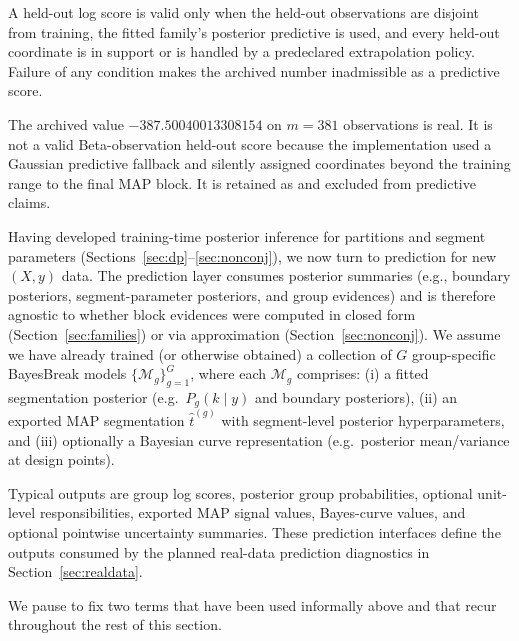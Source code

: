 \begin{definition}
\label{def:metric-loglik}
A held-out log score is valid only when the held-out observations are disjoint from training,
the fitted family's posterior predictive is used, and every held-out coordinate is in support or
is handled by a predeclared extrapolation policy. Failure of any condition makes the archived
number inadmissible as a predictive score.
\end{definition}

\begin{exclusionbox}
The archived value $-387.50040013308154$ on $m=381$ observations is real. It is not a valid
Beta-observation held-out score because the implementation used a Gaussian predictive fallback and
silently assigned coordinates beyond the training range to the final MAP block. It is retained as
 and excluded from predictive claims.
\end{exclusionbox}
\label{sec:prediction}

Having developed training-time posterior inference for partitions and segment parameters (Sections~\ref{sec:dp}--\ref{sec:nonconj}), we now turn to prediction for new $(X,y)$ data.
The prediction layer consumes posterior summaries (e.g., boundary posteriors, segment-parameter posteriors, and group evidences) and is therefore agnostic to whether block evidences were computed in closed form (Section~\ref{sec:families}) or via approximation (Section~\ref{sec:nonconj}). We assume we have already trained (or otherwise obtained)
a collection of $G$ group-specific BayesBreak models
$\{\mathcal{M}_g\}_{g=1}^G$, where each $\mathcal{M}_g$ comprises:
(i) a fitted segmentation posterior (e.g.\ $P_g(k\mid y)$ and boundary posteriors),
(ii) an exported MAP segmentation $\widehat{t}^{(g)}$ with segment-level posterior
hyperparameters, and (iii) optionally a Bayesian curve representation
(e.g.\ posterior mean/variance at design points).

Typical outputs are group log scores, posterior group probabilities, optional unit-level
responsibilities, exported MAP signal values, Bayes-curve values, and optional pointwise
uncertainty summaries. These prediction interfaces define the outputs consumed by the planned real-data prediction diagnostics in Section~\ref{sec:realdata}.

We pause to fix two terms that have been used informally above and that recur throughout the rest of this section.

